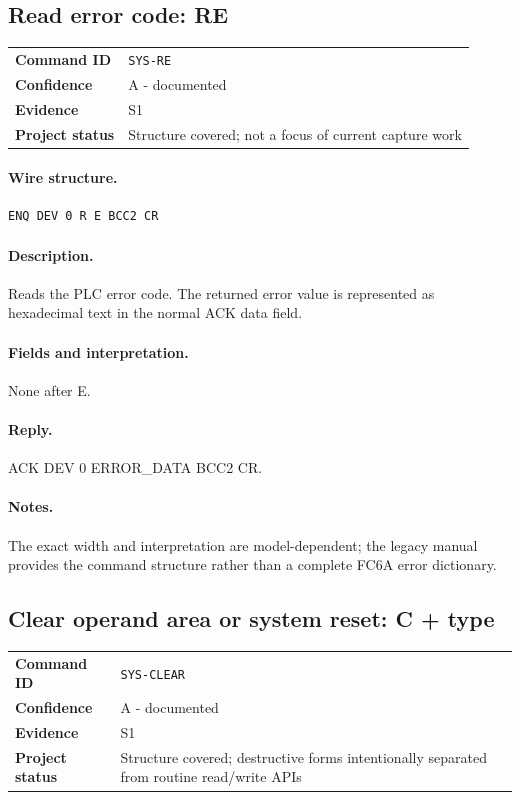 \documentclass[10pt,letterpaper]{article}
\begin{document}
\subsection{Read error code: RE}
\begin{tabularx}{\textwidth}{@{}>{\bfseries}p{2.8cm}X@{}}
Command ID & \texttt{SYS-RE} \\
Confidence & A - documented \\
Evidence & S1 \\
Project status & Structure covered; not a focus of current capture work \\
\end{tabularx}
\vspace{0.35em}
\paragraph{Wire structure.}
\begin{Verbatim}[breaklines=true,breakanywhere=true,fontsize=\small]
ENQ DEV 0 R E BCC2 CR
\end{Verbatim}
\paragraph{Description.} Reads the PLC error code. The returned error value is represented as hexadecimal text in the normal ACK data field.
\paragraph{Fields and interpretation.}
\begin{description}[style=nextline,leftmargin=3.2cm,labelwidth=3.0cm,font=\normalfont\bfseries]
\item[Request payload] None after E.
\end{description}
\paragraph{Reply.} ACK DEV 0 ERROR\_DATA BCC2 CR.
\paragraph{Notes.} The exact width and interpretation are model-dependent; the legacy manual provides the command structure rather than a complete FC6A error dictionary.

\subsection{Clear operand area or system reset: C + type}
\begin{tabularx}{\textwidth}{@{}>{\bfseries}p{2.8cm}X@{}}
Command ID & \texttt{SYS-CLEAR} \\
Confidence & A - documented \\
Evidence & S1 \\
Project status & Structure covered; destructive forms intentionally separated from routine read/write APIs \\
\end{tabularx}
\vspace{0.35em}
\end{document}
